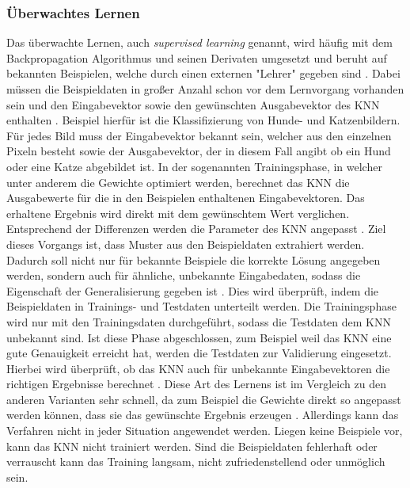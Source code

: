 \subsubsection{Überwachtes Lernen}
\label{subsubsec:supervised_learning}
Das überwachte Lernen, auch \emph{supervised learning} genannt, wird häufig mit dem Backpropagation Algorithmus und seinen Derivaten umgesetzt und beruht auf bekannten Beispielen, welche durch einen externen "Lehrer" gegeben sind \cite{zell2003simulation}. Dabei müssen die Beispieldaten in großer Anzahl schon vor dem Lernvorgang vorhanden sein und den Eingabevektor sowie den gewünschten Ausgabevektor des \ac{KNN} enthalten \cite{zell2003simulation}. Beispiel hierfür ist die Klassifizierung von Hunde- und Katzenbildern. Für jedes Bild muss der Eingabevektor bekannt sein, welcher aus den einzelnen Pixeln besteht sowie der Ausgabevektor, der in diesem Fall angibt ob ein Hund oder eine Katze abgebildet ist. In der sogenannten Trainingsphase, in welcher unter anderem die Gewichte optimiert werden, berechnet das \ac{KNN} die Ausgabewerte für die in den Beispielen enthaltenen Eingabevektoren. Das erhaltene Ergebnis wird direkt mit dem gewünschtem Wert verglichen. Entsprechend der Differenzen werden die Parameter des \ac{KNN} angepasst \cite{kriesel2008kleiner}. Ziel dieses Vorgangs ist, dass Muster aus den Beispieldaten extrahiert werden. Dadurch soll nicht nur für bekannte Beispiele die korrekte Lösung angegeben werden, sondern auch für ähnliche, unbekannte Eingabedaten, sodass die Eigenschaft der Generalisierung gegeben ist \cite{zell2003simulation}. Dies wird überprüft, indem die Beispieldaten in Trainings- und Testdaten unterteilt werden. Die Trainingsphase wird nur mit den Trainingsdaten durchgeführt, sodass die Testdaten dem \ac{KNN} unbekannt sind. Ist diese Phase abgeschlossen, zum Beispiel weil das \ac{KNN} eine gute Genauigkeit erreicht hat, werden die Testdaten zur Validierung eingesetzt. Hierbei wird überprüft, ob das \ac{KNN} auch für unbekannte Eingabevektoren die richtigen Ergebnisse berechnet \cite{kriesel2008kleiner}. Diese Art des Lernens ist im Vergleich zu den anderen Varianten sehr schnell, da zum Beispiel die Gewichte direkt so angepasst werden können, dass sie das gewünschte Ergebnis erzeugen \cite{zell2003simulation}. Allerdings kann das Verfahren nicht in jeder Situation angewendet werden. Liegen keine Beispiele vor, kann das \ac{KNN} nicht trainiert werden. Sind die Beispieldaten fehlerhaft oder verrauscht kann das Training langsam, nicht zufriedenstellend oder unmöglich sein.

